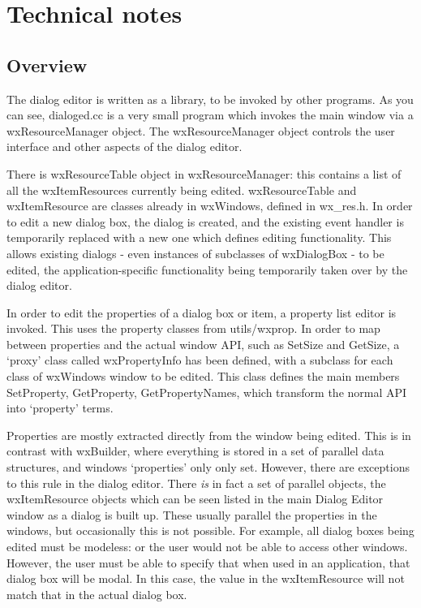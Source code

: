 \chapter{Technical notes}\label{technotes}
%
\setfooter{\thepage}{}{}{}{}{\thepage}%

\section{Overview}

The dialog editor is written as a library, to be invoked by other programs. As you can see,
dialoged.cc is a very small program which invokes the main window via a wxResourceManager
object. The wxResourceManager object controls the user interface and other aspects
of the dialog editor.

There is wxResourceTable object in wxResourceManager: this contains a list of
all the wxItemResources currently being edited. wxResourceTable and wxItemResource
are classes already in wxWindows, defined in wx\_res.h. In order to edit a new
dialog box, the dialog is created, and the existing event handler is temporarily replaced
with a new one which defines editing functionality. This allows existing dialogs - even
instances of subclasses of wxDialogBox - to be edited, the application-specific functionality
being temporarily taken over by the dialog editor.

In order to edit the properties of a dialog box or item, a property list editor is invoked.
This uses the property classes from utils/wxprop. In order to map between properties and the
actual window API, such as SetSize and GetSize, a `proxy' class called wxPropertyInfo
has been defined, with a subclass for each class of wxWindows window to be edited.
This class defines the main members SetProperty, GetProperty, GetPropertyNames,
which transform the normal API into `property' terms.

Properties are mostly extracted directly from the window being edited. This is
in contrast with wxBuilder, where everything is stored in a set of parallel
data structures, and windows `properties' only only set. However, there
are exceptions to this rule in the dialog editor. There {\it is} in fact a set of
parallel objects, the wxItemResource objects which can be seen listed in
the main Dialog Editor window as a dialog is built up. These usually parallel
the properties in the windows, but occasionally this is not possible. For example,
all dialog boxes being edited must be modeless: or the user would not be
able to access other windows. However, the user must be able to specify that
when used in an application, that dialog box will be modal. In this case,
the value in the wxItemResource will not match that in the actual dialog box.

